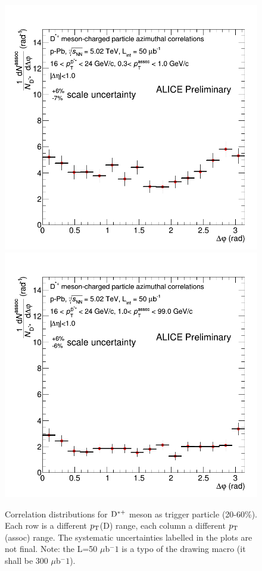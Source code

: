 \begin{figure}
{\includegraphics[width=0.32\linewidth]{figuresVsCent/Dstar/Correlations/2060/CanvaAndVariedHistopPbDstarPt16to24assocPt03to1.png}}
{\includegraphics[width=0.32\linewidth]{figuresVsCent/Dstar/Correlations/2060/CanvaAndVariedHistopPbDstarPt16to24assocPt1to99.png}}
 \caption{Correlation distributions for ${\rm D^{*+}}$ meson as trigger particle (20-60\%). Each row is a different $p_{\rm T}$(D) range, each column a different $p_{\rm T}$(assoc) range. The systematic uncertainties labelled in the plots are not final. Note: the L=50 $\mu$b$^-1$ is a typo of the drawing macro (it shall be 300 $\mu$b$^-1$).}
\label{fig:Dstarcorr2060}
\end{figure}

